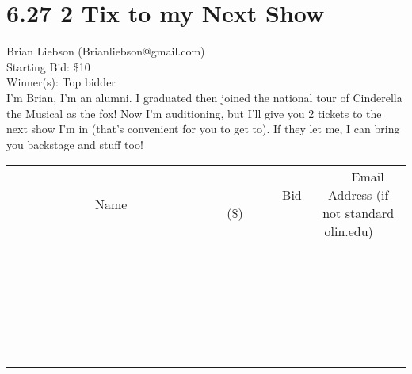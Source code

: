 \documentclass[11pt]{article}
\begin{document}
\section*{6.27 2 Tix to my Next Show}
Brian Liebson (Brianliebson@gmail.com) \\
Starting Bid: \$10 \\
Winner(s): 
Top bidder \\
I'm Brian, I'm an alumni. I graduated then joined the national tour of Cinderella the Musical as the fox! Now I'm auditioning, but I'll give you 2 tickets to the next show I'm in (that's convenient for you to get to). If they let me, I can bring you backstage and stuff too! \\[6ex]
\begin{tabular}{c c c}
~~~~~~~~~~~~~Name~~~~~~~~~~~~~ & ~~~~~~~~~Bid (\$)~~~~~~~~~ & ~~~Email Address (if not standard olin.edu)~~~ \\
 & & \\
\hline
 & & \\
\hline
 & & \\
\hline
 & & \\
\hline
 & & \\
\hline
 & & \\
\hline
 & & \\
\hline
 & & \\
\hline
 & & \\
\hline
 & & \\
\hline
 & & \\
\hline
 & & \\
\hline
 & & \\
\hline
 & & \\
\hline
 & & \\
\hline
 & & \\
\hline
 & & \\
\hline
 & & \\
\hline
 & & \\
\hline
 & & \\
\hline
 & & \\
\hline
 & & \\
\hline
 & & \\
\hline
 & & \\
\hline
 & & \\
\hline
 & & \\
\hline
\end{tabular}
\clearpage
\end{document}
